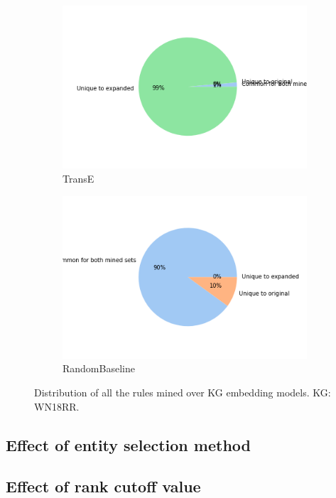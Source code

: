 \begin{figure}[h]
\begin{subfigure}[b]{0.49\textwidth}
            \centering 
            \includegraphics[width=\textwidth]{figures/results/pie_charts-model/transE_wn18rr.png}
            \caption[]%
            {{\small TransE}}    
            \label{fig:trasE_pie_wn18rr}
        \end{subfigure}
        \hfill
        \begin{subfigure}[b]{0.49\textwidth}   
            \centering 
            \includegraphics[width=\textwidth]{figures/results/pie_charts-model/randomBaseline_wn18rr.png}
            \caption[]%
            {{\small RandomBaseline}}    
            \label{fig:randomBaseline_pie_wn18rr}
        \end{subfigure}
        \caption[ The average and standard deviation of critical parameters ]
        {\small Distribution of all the rules mined over KG embedding models. KG: WN18RR.} 
        \label{fig:model_pies_wn18rr}
    \end{figure}


\subsection{Effect of entity selection method}

\subsection{Effect of rank cutoff value}